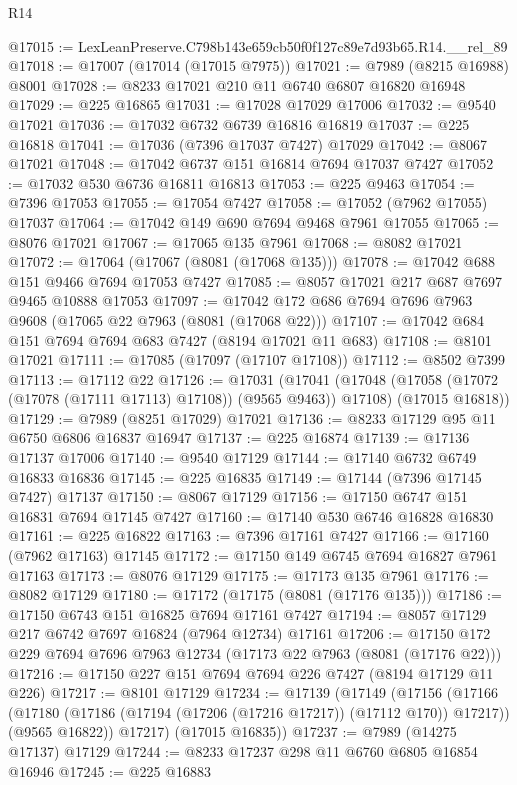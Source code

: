 \begin{lexlean}{R14}
\begin{coremodule}
@17015 := LexLeanPreserve.C798b143e659cb50f0f127c89e7d93b65.R14.__rel_89
@17018 := @17007 (@17014 (@17015 @7975))
@17021 := @7989 (@8215 @16988) @8001
@17028 := @8233 @17021 @210 @11 @6740 @6807 @16820 @16948
@17029 := @225 @16865
@17031 := @17028 @17029 @17006
@17032 := @9540 @17021
@17036 := @17032 @6732 @6739 @16816 @16819
@17037 := @225 @16818
@17041 := @17036 (@7396 @17037 @7427) @17029
@17042 := @8067 @17021
@17048 := @17042 @6737 @151 @16814 @7694 @17037 @7427
@17052 := @17032 @530 @6736 @16811 @16813
@17053 := @225 @9463
@17054 := @7396 @17053
@17055 := @17054 @7427
@17058 := @17052 (@7962 @17055) @17037
@17064 := @17042 @149 @690 @7694 @9468 @7961 @17055
@17065 := @8076 @17021
@17067 := @17065 @135 @7961
@17068 := @8082 @17021
@17072 := @17064 (@17067 (@8081 (@17068 @135)))
@17078 := @17042 @688 @151 @9466 @7694 @17053 @7427
@17085 := @8057 @17021 @217 @687 @7697 @9465 @10888 @17053
@17097 := @17042 @172 @686 @7694 @7696 @7963 @9608 (@17065 @22 @7963 (@8081 (@17068 @22)))
@17107 := @17042 @684 @151 @7694 @7694 @683 @7427 (@8194 @17021 @11 @683)
@17108 := @8101 @17021
@17111 := @17085 (@17097 (@17107 @17108))
@17112 := @8502 @7399
@17113 := @17112 @22
@17126 := @17031
    (@17041
      (@17048 (@17058 (@17072 (@17078 (@17111 @17113) @17108)) (@9565 @9463)) @17108)
      (@17015 @16818))
@17129 := @7989 (@8251 @17029) @17021
@17136 := @8233 @17129 @95 @11 @6750 @6806 @16837 @16947
@17137 := @225 @16874
@17139 := @17136 @17137 @17006
@17140 := @9540 @17129
@17144 := @17140 @6732 @6749 @16833 @16836
@17145 := @225 @16835
@17149 := @17144 (@7396 @17145 @7427) @17137
@17150 := @8067 @17129
@17156 := @17150 @6747 @151 @16831 @7694 @17145 @7427
@17160 := @17140 @530 @6746 @16828 @16830
@17161 := @225 @16822
@17163 := @7396 @17161 @7427
@17166 := @17160 (@7962 @17163) @17145
@17172 := @17150 @149 @6745 @7694 @16827 @7961 @17163
@17173 := @8076 @17129
@17175 := @17173 @135 @7961
@17176 := @8082 @17129
@17180 := @17172 (@17175 (@8081 (@17176 @135)))
@17186 := @17150 @6743 @151 @16825 @7694 @17161 @7427
@17194 := @8057 @17129 @217 @6742 @7697 @16824 (@7964 @12734) @17161
@17206 := @17150 @172 @229 @7694 @7696 @7963 @12734 (@17173 @22 @7963 (@8081 (@17176 @22)))
@17216 := @17150 @227 @151 @7694 @7694 @226 @7427 (@8194 @17129 @11 @226)
@17217 := @8101 @17129
@17234 := @17139
    (@17149
      (@17156
        (@17166
          (@17180 (@17186 (@17194 (@17206 (@17216 @17217)) (@17112 @170)) @17217))
          (@9565 @16822))
        @17217)
      (@17015 @16835))
@17237 := @7989 (@14275 @17137) @17129
@17244 := @8233 @17237 @298 @11 @6760 @6805 @16854 @16946
@17245 := @225 @16883

\end{coremodule}
\end{lexlean}
